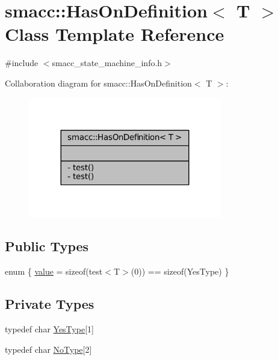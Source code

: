 \hypertarget{classsmacc_1_1HasOnDefinition}{}\section{smacc\+:\+:Has\+On\+Definition$<$ T $>$ Class Template Reference}
\label{classsmacc_1_1HasOnDefinition}


{\ttfamily \#include $<$smacc\+\_\+state\+\_\+machine\+\_\+info.\+h$>$}



Collaboration diagram for smacc\+:\+:Has\+On\+Definition$<$ T $>$\+:
\nopagebreak
\begin{figure}[H]
\begin{center}
\leavevmode
\includegraphics[width=239pt]{classsmacc_1_1HasOnDefinition__coll__graph}
\end{center}
\end{figure}
\subsection*{Public Types}
\begin{DoxyCompactItemize}
\item 
enum \{ \hyperlink{classsmacc_1_1HasOnDefinition_a5bbbdf43322ac6428797ff51c8a78f3aa0ee3bd0e07973c128ab64f02600c7720}{value} = sizeof(test$<$T$>$(0)) == sizeof(Yes\+Type)
 \}
\end{DoxyCompactItemize}
\subsection*{Private Types}
\begin{DoxyCompactItemize}
\item 
typedef char \hyperlink{classsmacc_1_1HasOnDefinition_af147416543b9d5a19d3dfc4f3f0d42a6}{Yes\+Type}\mbox{[}1\mbox{]}
\item 
typedef char \hyperlink{classsmacc_1_1HasOnDefinition_ab424fbc32a091d6271cabe47eb0725ca}{No\+Type}\mbox{[}2\mbox{]}
\end{DoxyCompactItemize}
